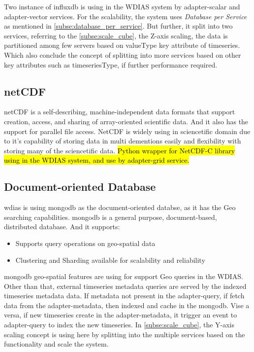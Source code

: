 Two instance of \acrshort{influxdb} is using in the WDIAS system by adapter-scalar and adapter-vector services. For the scalability, the system uses \emph{Database per Service} as mentioned in \cref{subse:database_per_service}.
But further, it split into two services, referring to the \cref{subse:scale_cube}, the Z-axis scaling, the data is partitioned among few servers based on valueType key attribute of timeseries.
Which also conclude the concept of splitting into more services based on other key attributes such as timeseriesType, if further performance required.

\subsection{\acrfull{netCDF}} 
\label{subse:netcdf}
\acrshort{netCDF} \cite{unidataUnidataNetCDF} is a self-describing, machine-independent data formats that support creation, access, and sharing of array-oriented scientific data.
And it also has the support for parallel file access.
NetCDF is widely using in sciencetific domain due to it's capability of storing data in multi dementions easily and flexibility with storing many of the sciencetific data. \hl{
Python wrapper for NetCDF-C library using in the WDIAS system, and use by adapter-grid service.}

\subsection{Document-oriented Database}
\label{subse:mongodb}

\acrshort{wdias} is using \acrshort{mongodb} as the document-oriented databse, as it has the Geo searching capabilities.
\acrshort{mongodb} \cite{mongodbMongoDBManual} is a general purpose, document-based, distributed database. And it supports:
\begin{itemize}
  \item Supports query operations on geo-spatial data \cite{mongodbMongoDBManual}
  \item Clustering and Sharding available for scalability and reliability
\end{itemize}
\acrshort{mongodb} geo-spatial features are using for support Geo queries in the WDIAS. Other than that, external timeseries metadata queries are served by the indexed timeseries metadata data.
If metadata not present in the adapter-query, if fetch data from the adapter-metadata, then indexed and cache in the \acrshort{mongodb}. Vise a versa, if new timeseries create in the adapter-metadata, it trigger an event to adapter-query to index the new timeseries.
In \cref{subse:scale_cube}, the Y-axis scaling concept is using here by splitting into the multiple services based on the functionality and scale the system.

